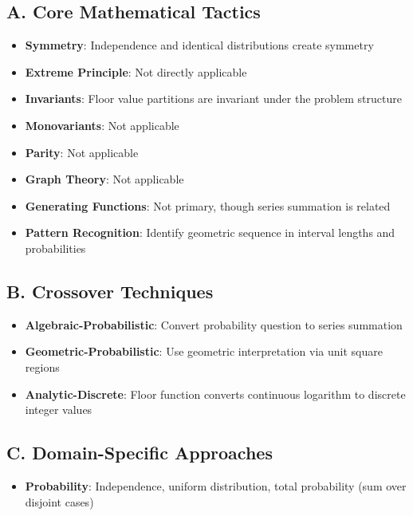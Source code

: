 \documentclass[11pt]{article}
\begin{document}
\begin{tacticalbox}
\subsection*{A. Core Mathematical Tactics}
\begin{itemize}[leftmargin=*]
    \item \textbf{Symmetry}: Independence and identical distributions create symmetry
    
    \item \textbf{Extreme Principle}: Not directly applicable
    
    \item \textbf{Invariants}: Floor value partitions are invariant under the problem structure
    
    \item \textbf{Monovariants}: Not applicable
    
    \item \textbf{Parity}: Not applicable
    
    \item \textbf{Graph Theory}: Not applicable
    
    \item \textbf{Generating Functions}: Not primary, though series summation is related
    
    \item \textbf{Pattern Recognition}: Identify geometric sequence in interval lengths and probabilities
\end{itemize}

\subsection*{B. Crossover Techniques}
\begin{itemize}[leftmargin=*]
    \item \textbf{Algebraic-Probabilistic}: Convert probability question to series summation
    
    \item \textbf{Geometric-Probabilistic}: Use geometric interpretation via unit square regions
    
    \item \textbf{Analytic-Discrete}: Floor function converts continuous logarithm to discrete integer values
\end{itemize}

\subsection*{C. Domain-Specific Approaches}
\begin{itemize}[leftmargin=*]
    \item \textbf{Probability}: Independence, uniform distribution, total probability (sum over disjoint cases)
    

\end{itemize}
\end{tacticalbox}
\end{document}
